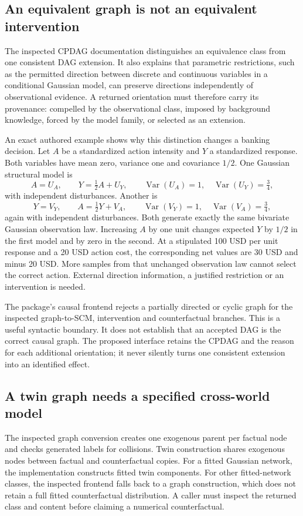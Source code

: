 \subsection{An equivalent graph is not an equivalent intervention}
The inspected CPDAG documentation distinguishes an equivalence class from one consistent DAG extension. It also explains that parametric restrictions, such as the permitted direction between discrete and continuous variables in a conditional Gaussian model, can preserve directions independently of observational evidence. A returned orientation must therefore carry its provenance: compelled by the observational class, imposed by background knowledge, forced by the model family, or selected as an extension.~\citep{exec24_bnlearn_sources}

An exact authored example shows why this distinction changes a banking decision. Let $A$ be a standardized action intensity and $Y$ a standardized response. Both variables have mean zero, variance one and covariance $1/2$. One Gaussian structural model is
\[
 A=U_A,\qquad Y=\tfrac12 A+U_Y,
 \qquad \operatorname{Var}(U_A)=1,\quad \operatorname{Var}(U_Y)=\tfrac34,
\]
with independent disturbances. Another is
\[
 Y=V_Y,\qquad A=\tfrac12 Y+V_A,
 \qquad \operatorname{Var}(V_Y)=1,\quad \operatorname{Var}(V_A)=\tfrac34,
\]
again with independent disturbances. Both generate exactly the same bivariate Gaussian observation law. Increasing $A$ by one unit changes expected $Y$ by $1/2$ in the first model and by zero in the second. At a stipulated 100 USD per unit response and a 20 USD action cost, the corresponding net values are 30 USD and minus 20 USD. More samples from that unchanged observation law cannot select the correct action. External direction information, a justified restriction or an intervention is needed.~\citep{exec24_bnlearn_contract}

The package's causal frontend rejects a partially directed or cyclic graph for the inspected graph-to-SCM, intervention and counterfactual branches. This is a useful syntactic boundary. It does not establish that an accepted DAG is the correct causal graph. The proposed interface retains the CPDAG and the reason for each additional orientation; it never silently turns one consistent extension into an identified effect.~\citep{exec24_bnlearn_sources,exec24_bnlearn_contract}

\subsection{A twin graph needs a specified cross-world model}
The inspected graph conversion creates one exogenous parent per factual node and checks generated labels for collisions. Twin construction shares exogenous nodes between factual and counterfactual copies. For a fitted Gaussian network, the implementation constructs fitted twin components. For other fitted-network classes, the inspected frontend falls back to a graph construction, which does not retain a full fitted counterfactual distribution. A caller must inspect the returned class and content before claiming a numerical counterfactual.~\citep{exec24_bnlearn_sources}

